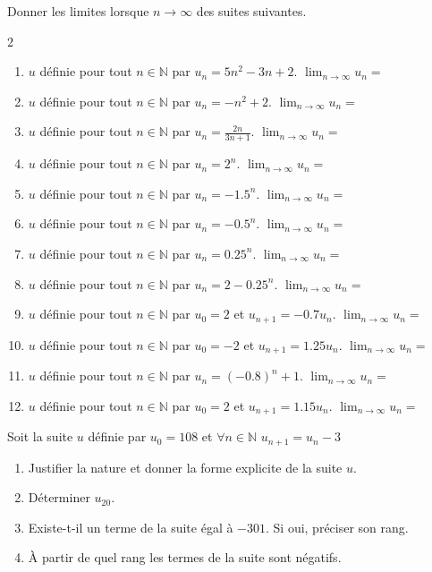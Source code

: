 \documentclass[main.tex]{subfiles}
\begin{document}
\begin{exercise}\label{chapter05:exercise:suites17} Donner les limites lorsque $n\to\infty$ des suites suivantes.
\begin{spacing}{2}
\begin{enumerate}[label=\arabic*),leftmargin=*]
	\item $u$ définie pour tout $n\in\mathbb{N}$ par $u_n=5n^2-3n+2$. $\lim_{n\to\infty}u_n=$\dotfill 
	\item $u$ définie pour tout $n\in\mathbb{N}$ par $u_n=-n^2+2$. $\lim_{n\to\infty}u_n=$\dotfill  
	\item $u$ définie pour tout $n\in\mathbb{N}$ par $u_n=\frac{2n}{3n+1}$. $\lim_{n\to\infty}u_n=$\dotfill 
	\item $u$ définie pour tout $n\in\mathbb{N}$ par $u_n=2^n$. $\lim_{n\to\infty}u_n=$\dotfill 
	\item $u$ définie pour tout $n\in\mathbb{N}$ par $u_n=-1.5^n$. $\lim_{n\to\infty}u_n=$\dotfill 
	\item $u$ définie pour tout $n\in\mathbb{N}$ par $u_n=-0.5^n$. $\lim_{n\to\infty}u_n=$\dotfill 
	\item $u$ définie pour tout $n\in\mathbb{N}$ par $u_n=0.25^n$. $\lim_{n\to\infty}u_n=$\dotfill 
	\item $u$ définie pour tout $n\in\mathbb{N}$ par $u_n=2-0.25^n$. $\lim_{n\to\infty}u_n=$\dotfill  
	\item $u$ définie pour tout $n\in\mathbb{N}$ par $u_0=2$ et $u_{n+1}=-0.7u_n$. $\lim_{n\to\infty}u_n=$\dotfill  
	\item $u$ définie pour tout $n\in\mathbb{N}$ par $u_0=-2$ et $u_{n+1}=1.25u_n$. $\lim_{n\to\infty}u_n=$\dotfill  
	\item $u$ définie pour tout $n\in\mathbb{N}$ par $u_n=(-0.8)^n+1$. $\lim_{n\to\infty}u_n=$\dotfill 
	\item $u$ définie pour tout $n\in\mathbb{N}$ par $u_0=2$ et $u_{n+1}=1.15u_n$. $\lim_{n\to\infty}u_n=$\dotfill  
\end{enumerate} 
\end{spacing}
\end{exercise} 
%	 
\newpage 
\begin{exercise}  \label{chapter05:exercise:suites18}
	Soit la suite $u$ définie par  $u_0=108$ et $\forall n\in\mathbb{N}$   $u_{n+1}=u_n-3$
	\begin{enumerate}[label=\arabic*),leftmargin=*] 
		\item Justifier la nature et donner la forme explicite de la suite $u$.
		\item Déterminer $u_{20}$.
		\item Existe-t-il un terme de la suite égal à $-301$. Si oui, préciser son rang.
		\item À partir de quel rang les termes de la suite sont négatifs.
	\end{enumerate}
\end{exercise}
\end{document}
